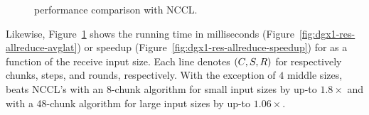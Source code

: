 \begin{figure}[tbp]
  \centering
  \hfill
  \caption{\allreduce performance comparison with NCCL.}
  \label{fig:dgx1-res-allreduce}
\end{figure}


Likewise, Figure~\ref{fig:dgx1-res-allreduce} shows the running time
in milliseconds (Figure~\ref{fig:dgx1-res-allreduce-avglat}) or
speedup (Figure~\ref{fig:dgx1-res-allreduce-speedup}) for \allreduce
as a function of the receive input size.  Each line denotes $(C,
S, R)$ for respectively chunks, steps, and rounds,
respectively. With the exception of $4$ middle sizes, \tool{} beats
NCCL's \allreduce with an 8-chunk algorithm for small input sizes by
up-to $1.8\times$ and with a 48-chunk algorithm for large input sizes
by up-to $1.06\times$.

